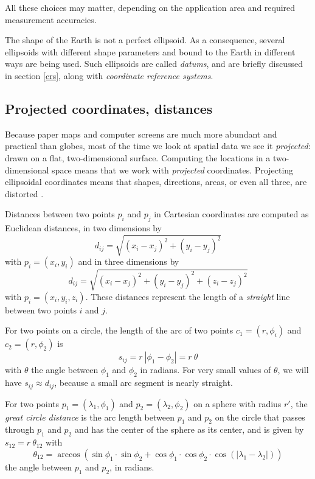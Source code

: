 \documentclass[]{book}
\begin{document}
All these choices may matter, depending on the application area
and required measurement accuracies.

The shape of the Earth is not a perfect ellipsoid. As a consequence,
several ellipsoids with different shape parameters and bound to
the Earth in different ways are being used. Such ellipsoids are called
\emph{datums}, and are briefly discussed in section \ref{crs}, along
with \emph{coordinate reference systems}.

\hypertarget{projections}{%
\subsection{Projected coordinates, distances}\label{projections}}

Because paper maps and computer screens are much more abundant
and practical than globes, most of the time we look at spatial
data we see it \emph{projected}: drawn on a flat, two-dimensional
surface. Computing the locations in a two-dimensional space means
that we work with \emph{projected} coordinates. Projecting ellipsoidal
coordinates means that shapes, directions, areas, or even all three,
are distorted \citep{iliffelott}.

Distances between two points \(p_i\) and \(p_j\) in Cartesian coordinates are computed
as Euclidean distances, in two dimensions by
\[d_{ij} = \sqrt{(x_i-x_j)^2+(y_i-y_j)^2}\]
with \(p_i = (x_i,y_i)\)
and in three dimensions by
\[d_{ij} = \sqrt{(x_i-x_j)^2+(y_i-y_j)^2+(z_i-z_j)^2}\]
with \(p_i = (x_i,y_i,z_i).\)
These distances represent the length of a \emph{straight} line between
two points \(i\) and \(j\).

For two points on a circle, the length of the arc of two points \(c_1 = (r,{\phi}_i)\) and
\(c_2 = (r, \phi_2)\) is
\[s_{ij}=r~|\phi_1-\phi_2| = r ~\theta\]
with \(\theta\) the angle between \(\phi_1\) and \(\phi_2\) in radians.
For very small values of \(\theta\), we will have \(s_{ij} \approx d_{ij}\),
because a small arc segment is nearly straight.

For two points \(p_1 = (\lambda_1,\phi_1)\) and \(p_2 = (\lambda_2,\phi_2)\) on a sphere with radius \(r'\), the \emph{great circle
distance} is the arc length between \(p_1\) and \(p_2\) on the circle
that passes through \(p_1\) and \(p_2\) and has the center of the sphere as its center, and
is given by \(s_{12} = r ~ \theta_{12}\) with
\[\theta_{12} = \arccos(\sin \phi_1 \cdot \sin \phi_2 + \cos \phi_1 \cdot \cos \phi_2 \cdot \cos(|\lambda_1-\lambda_2|))\]
the angle between \(p_1\) and \(p_2\), in radians.
\end{document}
